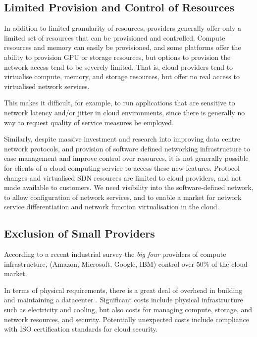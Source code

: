 \documentclass[conference,10pt]{IEEEtran}
\begin{document}

\subsection{Limited Provision and Control of Resources}

In addition to limited granularity of resources, providers generally offer
only a limited set of resources that can be provisioned and controlled. 
Compute resources and memory can easily be provisioned, and some platforms
offer the ability to provision GPU or storage resources, but options to
provision the network access tend to be severely limited. That is, cloud
providers tend to virtualise compute, memory, and storage resources, but
offer no real access to virtualised network services. 

This makes it difficult, for example, to run applications that are
sensitive to network latency and/or jitter in cloud environments, since
there is generally no way to request quality of service measures be
employed. 

Similarly, despite massive investment and research into improving data
centre network protocols, and provision of software defined networking
infrastructure to ease management and improve control over resources, 
it is not generally possible for clients of a cloud computing service
to access these new features. Protocol changes and virtualised SDN 
resources are limited to cloud providers, and not made available to
customers. We need visibility into the software-defined network, to
allow configuration of network services, and to enable a market for
network service differentiation and network function virtualisation
in the cloud. 


\subsection{Exclusion of Small Providers}

According to a recent industrial survey \cite{url3} the \emph{big four} providers of compute infrastructure, (Amazon, Microsoft, Google, IBM) control over 50\% of the cloud market. 

In terms of physical requirements, there is a great deal of overhead in building and maintaining a datacenter \cite{greenberg08cost}. Significant costs include physical infrastructure such as electricity and cooling, but also costs for managing compute, storage, and network resources, and security. Potentially unexpected costs include compliance with ISO certification standards for cloud security.
\end{document}
